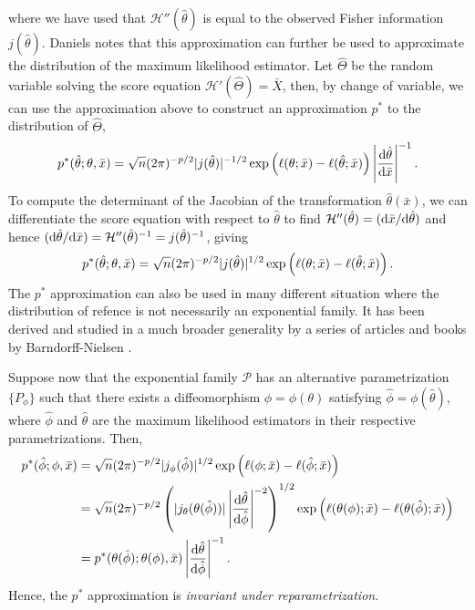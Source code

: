 where we have used that $\mathcal{H}''(\hat\theta)$ is equal to the observed Fisher information $j(\hat\theta)$. Daniels \cite{daniels1958} notes that this approximation can further be used to approximate the distribution of the maximum likelihood estimator. Let $\hat\Theta$ be the random variable solving the score equation $\mathcal{H}'(\hat\Theta) = \bar X$, then, by change of variable, we can use the approximation above to construct an approximation $p^*$ to the distribution of $\hat\Theta$,
\begin{equation*}
    p^*(\hat\theta; \theta, \bar x) = \sqrt{n} (2\pi)^{-p/2}|j(\hat\theta)|^{-1/2} \exp\left(\ell(\theta; \bar x) - \ell(\hat\theta; \bar x)\right) \left|\frac{\text{d} \hat\theta}{\text{d} \bar x}\right|^{-1}.
\end{equation*}
To compute the determinant of the Jacobian of the transformation $\hat\theta(\bar x)$, we can differentiate the score equation with respect to $\hat\theta$ to find $\mathcal{H}''(\hat\theta) = (\text{d} \bar x / \text{d} \hat\theta)$ and hence $(\text{d} \hat\theta / \text{d} \bar x) = \mathcal{H}''(\hat\theta)^{-1} = j(\hat\theta)^{-1}$, giving
\begin{equation} \label{eq-pstar}
    p^*(\hat\theta; \theta, \bar x) = \sqrt{n} (2\pi)^{-p/2}|j(\hat\theta)|^{1/2} \exp\left(\ell(\theta; \bar x) - \ell(\hat\theta; \bar x)\right).
\end{equation}
The $p^*$ approximation can also be used in many different situation where the distribution of refence is not necessarily an exponential family. It has been derived and studied in a much broader generality by a series of articles and books by Barndorff-Nielsen \cite{BarndorffNielsen1980,BarndorffNielsen1983}.  

Suppose now that the exponential family $\mathcal{P}$ has an alternative parametrization $\{ P_\phi \}$ such that there exists a diffeomorphism $\phi = \phi(\theta)$ satisfying $\hat\phi = \phi(\hat\theta)$, where $\hat\phi$ and $\hat\theta$ are the maximum likelihood estimators in their respective parametrizations. Then, 
\begin{align*}
    p^*(\hat\phi; \phi, \bar x) 
&= \sqrt{n} (2\pi)^{-p/2}|j_\phi(\hat\phi)|^{1/2} \exp\left(\ell(\phi; \bar x) - \ell(\hat\phi; \bar x)\right)\\
&= \sqrt{n} (2\pi)^{-p/2}\left(|j_\theta(\theta(\hat\phi))|\left|\frac{\text{d} \hat\theta}{\text{d} \hat\phi}\right|^{-2}\right)^{1/2} \exp\left(\ell(\theta(\phi); \bar x) - \ell(\theta(\hat\phi); \bar x)\right)\\
&= p^*(\theta(\hat\phi); \theta(\phi), \bar x)\left|\frac{\text{d} \hat\theta}{\text{d} \hat\phi}\right|^{-1}.
\end{align*}
Hence, the $p^*$ approximation is \textit{invariant under reparametrization}. 



